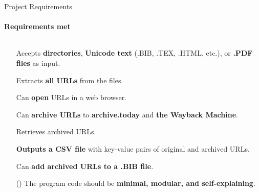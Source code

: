 \documentclass[
    ngerman,%
    authorontitle=true,
]{bfhbeamer}
\begin{document}
	\begin{frame}{Project Requirements}
		\framesubtitle{Requirements met}
		\begin{columns} %
			\begin{column}{0.7\textwidth} %
				\begin{itemize}
					\item[\checkmark] Accepts \textbf{directories}, \textbf{Unicode text} (.BIB, .TEX, .HTML, etc.), or \textbf{.PDF files} as input.
					\item[\checkmark] Extracts \textbf{all URLs} from the files.
					\item[\checkmark] Can \textbf{open} URLs in a web browser.
					\item[\checkmark] Can \textbf{archive URLs} to \textbf{archive.today} and \textbf{the Wayback Machine}.
					\item[\checkmark] Retrieves archived URLs.
					\item[\checkmark] \textbf{Outputs a CSV file} with key-value pairs of original and archived URLs.
					\item[\checkmark] Can \textbf{add archived URLs to a .BIB file}.
					\item[(\checkmark)] The program code should be \textbf{minimal, modular, and self-explaining}.
				\end{itemize}
				

\end{column}
\end{columns}
\end{frame}
\end{document}
